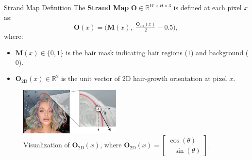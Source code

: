 \begin{frame}[t]{Strand Map Definition}
    The \textbf{Strand Map} $\mathbf{O} \in \mathbb{R}^{W \times H \times 3}$ is defined at each pixel $x$ as:
    \begin{equation}
        \mathbf{O}(x) = \bigl(\mathbf{M}(x),\; \tfrac{\mathbf{O}_{\mathrm{2D}}(x)}{2} + 0.5\bigr),
        \label{eq:strand_map}
    \end{equation}
    where:
    \begin{itemize}
        \item $\mathbf{M}(x) \in \{0, 1\}$ is the hair mask indicating hair regions ($1$) and background ($0$).
        \item $\mathbf{O}_{\mathrm{2D}}(x) \in \mathbb{R}^2$ is the unit vector of 2D hair-growth orientation at pixel $x$.
    \end{itemize}

    \vspace{5pt}
    \begin{figure}[t]
        \centering
        \includegraphics[width=0.45\textwidth]{assets/figures/method/hisa/o_2d.png}
        \caption{Visualization of $\mathbf{O}_{\mathrm{2D}}(x)$, where 
        $\mathbf{O}_{\mathrm{2D}}(x) = \begin{bmatrix}\cos(\theta) \\ -\sin(\theta)\end{bmatrix}$.}
        \label{fig:o_2d_example}
    \end{figure}
\end{frame}

